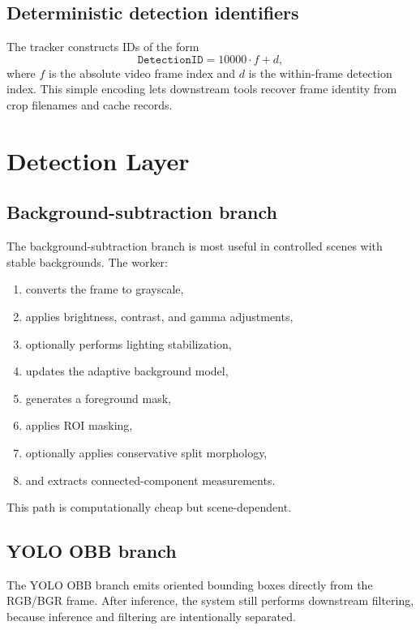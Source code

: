 \documentclass[11pt]{article}
\begin{document}
\subsection{Deterministic detection identifiers}

The tracker constructs IDs of the form
\begin{equation}
  \texttt{DetectionID} = 10000 \cdot f + d,
\end{equation}
where $f$ is the absolute video frame index and $d$ is the within-frame detection index. This simple encoding lets downstream tools recover frame identity from crop filenames and cache records.

\section{Detection Layer}

\subsection{Background-subtraction branch}

The background-subtraction branch is most useful in controlled scenes with stable backgrounds. The worker:

\begin{enumerate}
  \item converts the frame to grayscale,
  \item applies brightness, contrast, and gamma adjustments,
  \item optionally performs lighting stabilization,
  \item updates the adaptive background model,
  \item generates a foreground mask,
  \item applies ROI masking,
  \item optionally applies conservative split morphology,
  \item and extracts connected-component measurements.
\end{enumerate}

This path is computationally cheap but scene-dependent.

\subsection{YOLO OBB branch}

The YOLO OBB branch emits oriented bounding boxes directly from the RGB/BGR frame. After inference, the system still performs downstream filtering, because inference and filtering are intentionally separated.
\end{document}
